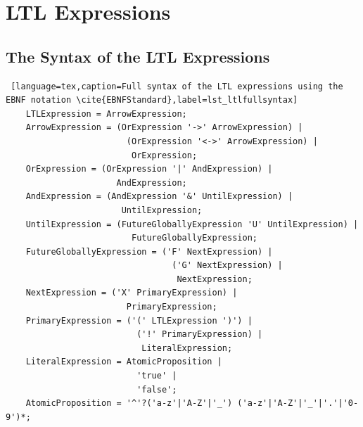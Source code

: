 \appendix



\chapter{LTL Expressions}

\section{The Syntax of the LTL Expressions}
\begin{lstlisting} [language=tex,caption=Full syntax of the LTL expressions using the EBNF notation \cite{EBNFStandard},label=lst_ltlfullsyntax]
	LTLExpression = ArrowExpression;
	ArrowExpression = (OrExpression '->' ArrowExpression) |
	                    (OrExpression '<->' ArrowExpression) |
	                     OrExpression;
	OrExpression = (OrExpression '|' AndExpression) |
	                  AndExpression;
	AndExpression = (AndExpression '&' UntilExpression) |
	                   UntilExpression;
	UntilExpression = (FutureGloballyExpression 'U' UntilExpression) |
	                     FutureGloballyExpression;
	FutureGloballyExpression = ('F' NextExpression) |
	                             ('G' NextExpression) |
	                              NextExpression;
	NextExpression = ('X' PrimaryExpression) |
	                    PrimaryExpression;
	PrimaryExpression = ('(' LTLExpression ')') |
	                      ('!' PrimaryExpression) |
	                       LiteralExpression;
	LiteralExpression = AtomicProposition |
	                      'true' |
	                      'false';
	AtomicProposition = '^'?('a-z'|'A-Z'|'_') ('a-z'|'A-Z'|'_'|'.'|'0-9')*;		
\end{lstlisting}

